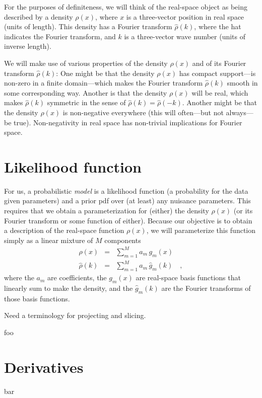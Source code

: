 \documentclass[12pt]{article}
\begin{document}
For the purposes of definiteness, we will think of the real-space
object as being described by a density $\rho(x)$, where $x$ is
a three-vector position in real space (units of length).
This density has a Fourier transform $\hat{\rho}(k)$, where the hat
indicates the Fourier transform, and $k$ is a three-vector wave number
(units of inverse length).

We will make use of various properties of the density $\rho(x)$ and of
its Fourier transform $\hat{\rho}(k)$:
One might be that the density $\rho(x)$ has compact support---is
non-zero in a finite domain---which makes the Fourier transform
$\hat{\rho}(k)$ smooth in some corresponding way.
Another is that the density $\rho(x)$ will be real, which makes
$\hat{\rho}(k)$ symmetric in the sense of
$\hat{\rho}(k)=\hat{\rho}(-k)$.
Another might be that the density $\rho(x)$ is non-negative everywhere
(this will often---but not always---be true).
Non-negativity in real space has non-trivial implications for Fourier
space.

\section{Likelihood function}

For us, a probabilistic \emph{model} is a likelihood function (a
probability for the data given parameters) and a prior pdf over (at
least) any nuisance parameters.
This requires that we obtain a parameterization for (either) the
density $\rho(x)$ (or its Fourier transform or some function of
either).
Because our objective is to obtain a description of the real-space
function $\rho(x)$, we will parameterize this function simply as a
linear mixture of $M$ components
\begin{eqnarray}
       \rho(x)  &=& \sum_{m=1}^M a_m\,     g_m(x)
  \\
  \hat{\rho}(k) &=& \sum_{m=1}^M a_m\,\hat{g}_m(k)
\quad ,
\end{eqnarray}
where the $a_m$ are coefficients, the $g_m(x)$ are real-space basis
functions that linearly sum to make the density, and the
$\hat{g}_m(k)$ are the Fourier transforms of those basis functions.

Need a terminology for projecting and slicing.

foo

\section{Derivatives}

bar
\end{document}
